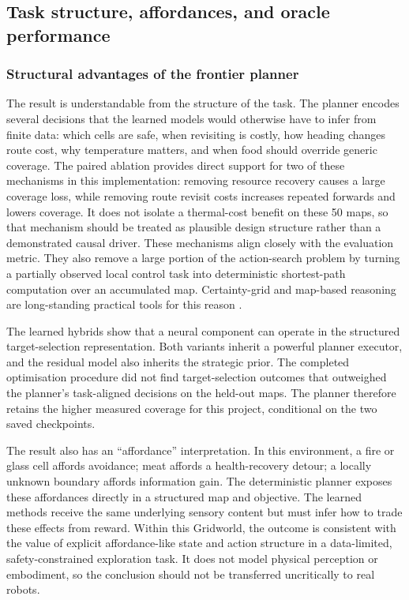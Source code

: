 \documentclass[10pt,letterpaper]{article}
\begin{document}
\subsection{Task structure, affordances, and oracle performance}

\subsubsection{Structural advantages of the frontier planner}

The result is understandable from the structure of the task. The planner encodes several decisions that the learned models would otherwise have to infer from finite data: which cells are safe, when revisiting is costly, how heading changes route cost, why temperature matters, and when food should override generic coverage. The paired ablation provides direct support for two of these mechanisms in this implementation: removing resource recovery causes a large coverage loss, while removing route revisit costs increases repeated forwards and lowers coverage. It does not isolate a thermal-cost benefit on these 50 maps, so that mechanism should be treated as plausible design structure rather than a demonstrated causal driver. These mechanisms align closely with the evaluation metric. They also remove a large portion of the action-search problem by turning a partially observed local control task into deterministic shortest-path computation over an accumulated map. Certainty-grid and map-based reasoning are long-standing practical tools for this reason \citep{moravec1988certainty}.

The learned hybrids show that a neural component can operate in the structured target-selection representation. Both variants inherit a powerful planner executor, and the residual model also inherits the strategic prior. The completed optimisation procedure did not find target-selection outcomes that outweighed the planner's task-aligned decisions on the held-out maps. The planner therefore retains the higher measured coverage for this project, conditional on the two saved checkpoints.

The result also has an ``affordance'' interpretation. In this environment, a fire or glass cell affords avoidance; meat affords a health-recovery detour; a locally unknown boundary affords information gain. The deterministic planner exposes these affordances directly in a structured map and objective. The learned methods receive the same underlying sensory content but must infer how to trade these effects from reward. Within this Gridworld, the outcome is consistent with the value of explicit affordance-like state and action structure in a data-limited, safety-constrained exploration task. It does not model physical perception or embodiment, so the conclusion should not be transferred uncritically to real robots.
\end{document}
